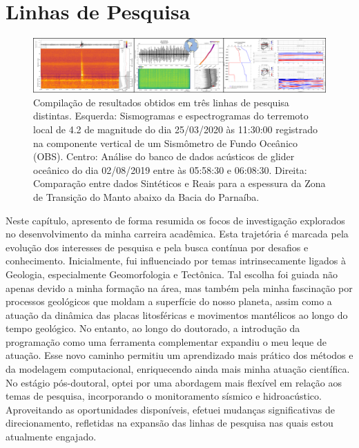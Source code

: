 \documentclass[10pt,a4paper,oneside]{book}
\newcommand{\HeroFigPad}{\vspace{-1cm}}
\begin{document}

\chapter{Linhas de Pesquisa}
\label{cap_pesquisa}

\begin{figure}[h]
  \HeroFigPad
  \begin{center}
    \includegraphics[width=\textwidth]{images/linhas_de_pesquisa.png}
  \end{center}
  \caption{
    Compilação de resultados obtidos em três linhas de pesquisa distintas. Esquerda: Sismogramas e espectrogramas do terremoto local de 4.2 de magnitude do dia 25/03/2020 às 11:30:00 registrado na componente vertical de um Sismômetro de Fundo Oceânico (OBS). Centro: Análise do banco de dados acústicos de glider oceânico do dia 02/08/2019 entre às 05:58:30 e 06:08:30. Direita: Comparação entre dados Sintéticos e Reais para a  espessura da Zona de Transição do Manto abaixo da Bacia do Parnaíba.
  }
\end{figure}

Neste capítulo, apresento de forma resumida os focos de investigação explorados no desenvolvimento da minha carreira acadêmica. Esta trajetória é marcada pela evolução dos interesses de pesquisa e pela busca contínua por desafios e conhecimento. Inicialmente, fui influenciado por temas intrinsecamente ligados à Geologia, especialmente Geomorfologia e Tectônica. Tal escolha foi guiada não apenas devido a minha formação na área, mas também pela minha fascinação por processos geológicos que moldam a superfície do nosso planeta, assim como a atuação da dinâmica das placas litosféricas e movimentos mantélicos ao longo do tempo geológico. No entanto, ao longo do doutorado, a introdução da programação como uma ferramenta complementar expandiu o meu leque de atuação. Esse novo caminho permitiu um aprendizado mais prático dos métodos e da modelagem computacional, enriquecendo ainda mais minha atuação científica. No estágio pós-doutoral, optei por uma abordagem mais flexível em relação aos temas de pesquisa, incorporando o monitoramento sísmico e hidroacústico. Aproveitando as oportunidades disponíveis, efetuei mudanças significativas de direcionamento, refletidas na expansão das linhas de pesquisa nas quais estou atualmente engajado. 
\end{document}

